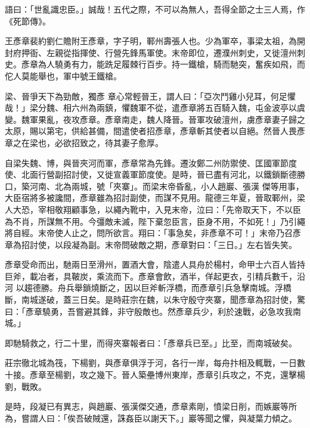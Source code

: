 
\begin{pinyinscope}

 語曰：「世亂識忠臣。」誠哉！五代之際，不可以為無人，吾得全節之士三人焉，作《死節傳》。



 王彥章裴約劉仁贍附王彥章，字子明，鄆州壽張人也。少為軍卒，事梁太祖，為開封府押衙、左親從指揮使、行營先鋒馬軍使。末帝即位，遷濮州刺史，又徙澶州刺史。彥章為人驍勇有力，能跣足履棘行百步。持一鐵槍，騎而馳突，奮疾如飛，而佗人莫能舉也，軍中號王鐵槍。



 梁、晉爭天下為勁敵，獨彥
 章心常輕晉王，謂人曰：「亞次鬥雞小兒耳，何足懼哉！」梁分魏、相六州為兩鎮，懼魏軍不從，遣彥章將五百騎入魏，屯金波亭以虞變。魏軍果亂，夜攻彥章。彥章南走，魏人降晉。晉軍攻破澶州，虜彥章妻子歸之太原，賜以第宅，供給甚備，間遣使者招彥章，彥章斬其使者以自絕。然晉人畏彥章之在梁也，必欲招致之，待其妻子愈厚。



 自梁失魏、博，與晉夾河而軍，彥章常為先鋒。遷汝鄭二州防禦使、匡國軍節度使、北面行營副招討使，又徙宣義軍節度使。是時，晉已盡有河北，以鐵鎖斷德勝口，築河南、北為兩城，號「夾寨」。而梁末帝昏亂，小人趙巖、張漢
 傑等用事，大臣宿將多被讒間，彥章雖為招討副使，而謀不見用。龍德三年夏，晉取鄆州，梁人大恐，宰相敬翔顧事急，以繩內靴中，入見末帝，泣曰：「先帝取天下，不以臣為不肖，所謀無不用。今彊敵未滅，陛下棄忽臣言，臣身不用，不如死！」乃引繩將自經。末帝使人止之，問所欲言。翔曰：「事急矣，非彥章不可！」末帝乃召彥章為招討使，以段凝為副。末帝問破敵之期，彥章對曰：「三日。」左右皆失笑。



 彥章受命而出，馳兩日至滑州，置酒大會，陰遣人具舟於楊村，命甲士六百人皆持巨斧，載冶者，具鞁炭，乘流而下。彥章會飲，酒半，佯起更衣，引精兵數千，沿河
 以趨德勝。舟兵舉鎖燒斷之，因以巨斧斬浮橋，而彥章引兵急擊南城。浮橋斷，南城遂破，蓋三日矣。是時莊宗在魏，以朱守殷守夾寨，聞彥章為招討使，驚曰：「彥章驍勇，吾嘗避其鋒，非守殷敵也。然彥章兵少，利於速戰，必急攻我南城。」



 即馳騎救之，行二十里，而得夾寨報者曰：「彥章兵已至。」比至，而南城破矣。



 莊宗徹北城為筏，下楊劉，與彥章俱浮于河，各行一岸，每舟抃相及輒戰，一日數十接。彥章至楊劉，攻之幾下。晉人築壘博州東岸，彥章引兵攻之，不克，還擊楊劉，戰敗。



 是時，段凝已有異志，與趙巖、張漢傑交通，彥章素剛，憤梁日削，而嫉巖等所
 為，嘗謂人曰：「俟吾破賊還，誅姦臣以謝天下。」巖等聞之懼，與凝葉力傾之。




\end{pinyinscope}
